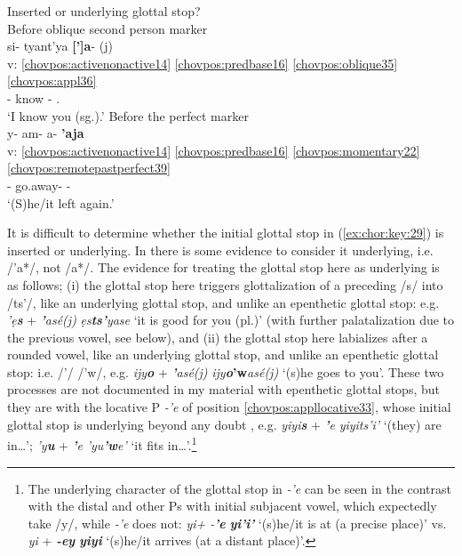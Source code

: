 \documentclass[output=paper]{langscibook}
\begin{document}
\ea\label{ex:chor:key:29} Inserted or underlying glottal stop?\\
    \ea\label{bkm:Ref86924174} Before oblique second person marker\\ {
    \glll {} si- tyant'ya \textbf{[']a}{}- (j)\\ 
        v: \ref{chovpos:activenonactive14} \ref{chovpos:predbase16} \ref{chovpos:oblique35} \ref{chovpos:appl36} \\ 
        {} \First{}- know \Second{}- \Ap.\Ins{} \\
    \glt `I know you (sg.).'
    }
    \ex\label{bkm:Ref86924177} Before the perfect marker \\ {
    \glll {} y- am- a- \textbf{'aja}\\
        v: \ref{chovpos:activenonactive14} \ref{chovpos:predbase16} \ref{chovpos:momentary22} \ref{chovpos:remotepastperfect39} \\ 
        {} \Third{}- go.away- \Mom{}- \textbf{\Prf{}}\\
    \glt `(S)he/it left again.'
    }
    \z 
\z 


It is difficult to determine whether the initial glottal stop in (\ref{ex:chor:key:29}) is inserted or underlying. In  there is some evidence to consider it underlying, i.e. /'a*/, not /a*/. The evidence for treating the glottal stop here as underlying is as follows; (i) the glottal stop here triggers glottalization of a preceding
/s/ into /ts'/, like an underlying glottal stop, and unlike an epenthetic glottal stop: e.g. \textit{'ẹ}\textbf{\textit{s}} + \textbf{\textit{'}}\textit{asé(j)} \MVRightarrow{} \textit{ẹs}\textbf{\textit{ts'}}\textit{yase} `it is good for you (pl.)' (with further palatalization due to the previous vowel, see below), and (ii) the glottal stop here labializes after a rounded vowel, like an underlying glottal stop, and unlike an epenthetic glottal stop: i.e. /'/ \MVRightarrow{} /'w/, e.g. \textit{ijy}\textbf{\textit{o}} + \textbf{\textit{'}}\textit{asé(j)} \MVRightarrow{} \textit{ijy}\textbf{\textit{o}'w}\textit{asé(j)} `(s)he goes to you'. These two processes are not documented in my material with epenthetic glottal stops, but they are with the locative P \textit{{}-'e} of position \ref{chovpos:appllocative33}, whose initial glottal stop is underlying beyond any doubt , e.g. \textit{yiyi}\textbf{\textit{s}} + \textbf{\textit{'}}\textit{e} \MVRightarrow{} \textit{yiyits'i'} `(they) are in…'; \textit{'y}\textbf{\textit{u}} + \textbf{\textit{'}}\textit{e} \MVRightarrow{} \textit{'yu}\textbf{\textit{'w}}\textit{e'} `it fits in…'.\footnote{The underlying character of the glottal stop in \textit{-'e} can be seen in the contrast with the distal and other Ps with initial subjacent vowel, which expectedly take /y/, while \textit{-'e} does not: \textit{yi+ -}\textbf{\textit{'e}} \textrm{\MVRightarrow{}} \textbf{\textit{yi'i'}} `(s)he/it is at (a precise place)' vs. \textit{yi} + \textbf{\textit{-ey}} \textrm{\MVRightarrow{}} \textbf{\textit{yiyi}} `(s)he/it arrives (at a distant place)'.} 
\end{document}
